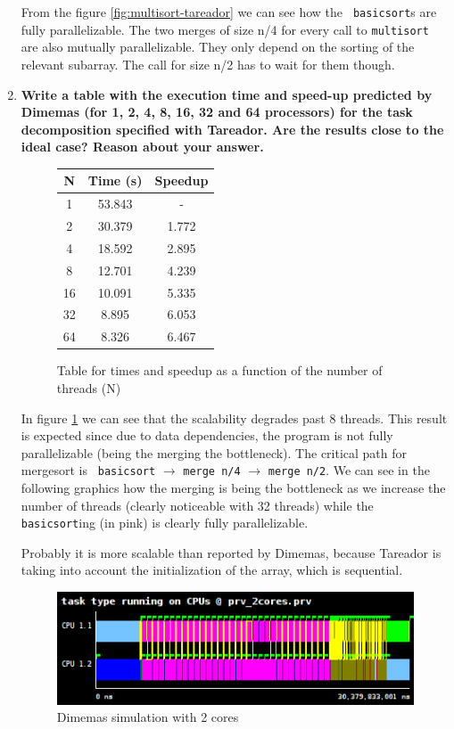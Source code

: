 \documentclass[a4paper,11pt]{article}
\begin{document}
\begin{enumerate}
From the figure \ref{fig:multisort-tareador} we can see how the {\tt
  basicsort}s are fully parallelizable. The two merges of size n/4 for
every call to {\tt multisort} are also mutually parallelizable. They
only depend on the sorting of the relevant subarray. The call for size n/2 has to wait
for them though.

\item
  \textbf{Write a table with the execution time and speed-up predicted
    by Dimemas (for 1, 2, 4, 8, 16, 32 and 64 processors) for the task
    decomposition specified with Tareador. Are the results close to the
    ideal case? Reason about your answer.}

\begin{figure}[h!]
  \center
\begin{tabular}{| c || c | c |}
\hline
\textbf{N} & \textbf{Time (s)} & \textbf{Speedup}
\\
\hline
\hline
 1 & 53.843 &     - \\ \hline
 2 & 30.379 & 1.772 \\ \hline
 4 & 18.592 & 2.895 \\ \hline
 8 & 12.701 & 4.239 \\ \hline
16 & 10.091 & 5.335 \\ \hline
32 &  8.895 & 6.053 \\ \hline
64 &  8.326 & 6.467 \\ \hline

\end{tabular}
\caption{Table for times and speedup as a function of the number of threads (N)}
\label{fig:speedup-table}
\end{figure}

In figure \ref{fig:speedup-table} we can see that the scalability
degrades past 8 threads. This result is expected since due to
data dependencies, the program is not fully parallelizable (being the
merging the bottleneck). The critical path for mergesort is {\tt
  basicsort} $\rightarrow$ {\tt merge n/4} $\rightarrow$ {\tt merge n/2}. We can see in the
following graphics how the merging is being the bottleneck as we
increase the number of threads (clearly noticeable with 32 threads) while
the {\tt basicsort}ing (in pink) is clearly fully parallelizable.

Probably it is more scalable than reported by Dimemas, because Tareador is
taking into account the initialization of the array, which is sequential.

\vspace{0.5cm}
\begin{figure}[h!]
  \center
  \includegraphics[width=1.0\textwidth]{figs/paraver_2_cores.png}
  \caption{Dimemas simulation with 2 cores}
\end{figure}


\end{enumerate}
\end{document}
